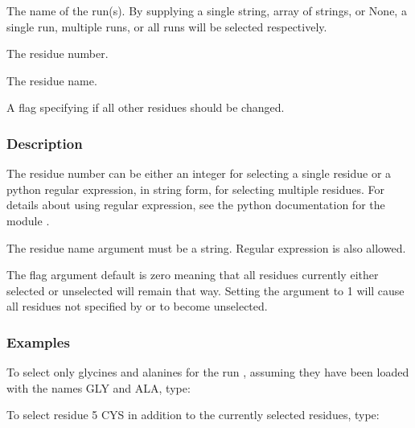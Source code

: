   The name of the run(s).  By supplying a single string, array of strings, or None, a single run, multiple runs, or all runs will be selected respectively.

  The residue number.

  The residue name.

  A flag specifying if all other residues should be changed.

\subsubsection{Description}

The residue number can be either an integer for selecting a single residue or a python 
regular expression,  in string form, for selecting multiple residues.  For details about
using regular expression,  see the python  documentation for the module 
.

The residue name argument must be a string.  Regular expression  is also allowed.

The 
 flag argument default is zero meaning that all residues currently either
selected or unselected will remain that way.  Setting the argument to 1 will cause all
residues not specified by 
 or 
 to become unselected.


\subsubsection{Examples}

To select only glycines and alanines for the run 
, assuming they have been loaded with
the names GLY and ALA, type:




To select residue 5 CYS in addition to the currently selected residues, type:





